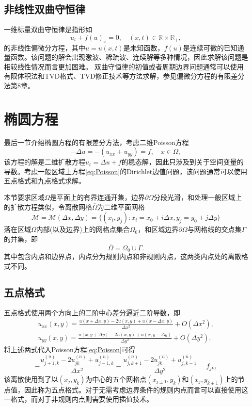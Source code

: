 \documentclass[a4paper,10pt]{ctexart}
\begin{document}
\subsection{非线性双曲守恒律}
一维标量双曲守恒律是指形如
\begin{equation}
    u_t + f(u)_x = 0,\quad (x,t)\in \mathbb{R}\times \mathbb{R}_+,
\end{equation}
的非线性偏微分方程，其中$ u = u(x,t) $是未知函数，$ f(u) $是连续可微的已知通量函数。该问题的解会出现激波、稀疏波、连续解等多种情况，因此求解该问题是相较线性情况而言更加困难。
双曲守恒律的初值或者周期边界问题通常可以使用有限体积法和TVD格式、TVD修正技术等方法求解，参见偏微分方程的有限差分法第8章。

\section{椭圆方程}
最后一节介绍椭圆方程的有限差分方法，考虑二维Poisson方程
\begin{equation}\label{eq:Poisson}
    -\Delta u = -(u_{xx}+u_{yy}) = f,\quad x\in \Omega,
\end{equation}
该方程的解是二维扩散方程$ u_t = \Delta u + f $的稳态解，因此只涉及到关于空间变量的导数。考虑一般区域上方程\eqref{eq:Poisson}的Dirichlet边值问题，该问题通常可以使用五点格式和九点格式求解。

本节要求区域$ \Omega $是平面上的有界连通开集，边界$ \partial \Omega $分段光滑，和处理一般区域上的扩散方程类似，令离散网格$ \overline{\Omega} $为二维平面网格
\[
    \mathcal{M} = \mathcal{M}(\Delta x,\Delta y) = \{(x_i,y_j):x_i = x_0+i\Delta x, y_j = y_0+j\Delta y \}
\]
落在区域$ \Omega $内部(以及边界)上的网格点集合$ \Omega_0 $，和区域边界$ \partial \Omega $与网格线的交点集$ \Gamma $的并集，即
\begin{equation}
    \overline{\Omega} = \Omega_0 \cup \Gamma.
\end{equation}
其中包含内点和边界点，内点分为规则内点和非规则内点，这两类内点处的离散格式不同。

\subsection{五点格式}
五点格式使用两个方向上的二阶中心差分逼近二阶导数，即
\[
    \begin{aligned}
        u_{xx}(x,y) = \frac{u(x+\Delta x,y)-2u(x,y)+u(x-\Delta x,y)}{\Delta x^2} + O(\Delta x^2),\\
        u_{yy}(x,y) = \frac{u(x,y+\Delta y)-2u(x,y)+u(x,y-\Delta y)}{\Delta y^2} + O(\Delta y^2),
    \end{aligned}
\]
将上述两式代入Poisson方程\eqref{eq:Poisson}可得
\begin{equation}
    - \frac{u^{(n)}_{j+1,k}-2u^{(n)}_{jk}+u^{(n)}_{j-1,k}}{\Delta x^2} - \frac{u^{(n)}_{j,k+1}-2u^{(n)}_{jk}+u^{(n)}_{j,k-1}}{\Delta y^2} = f_{jk},
\end{equation}
该离散使用到了以$ (x_j,y_k) $为中心的五个网格点$ (x_{j\pm 1},y_k) $和$ (x_j,y_{k\pm 1}) $上的节点值，因此称为五点格式。对于无需考虑边界条件的规则内点而言可以直接使用这一格式，而对于非规则内点则需要使用插值技术。
\end{document}
